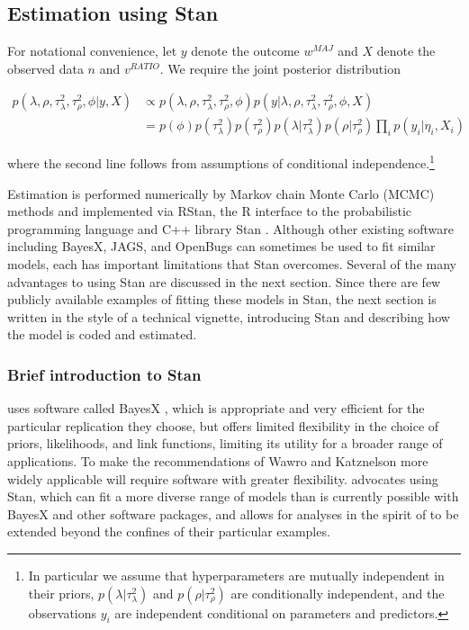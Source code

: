 \subsection{Estimation using Stan}

For notational convenience, let $y$ denote the outcome $w^{MAJ}$ and $X$ denote the observed data $n$ and $v^{RATIO}$. We require the joint posterior distribution

\begin{align*}
p(\lambda, \rho, \tau^2_\lambda, \tau^2_\rho, \phi | y, X) & \propto p(\lambda, \rho, \tau^2_\lambda, \tau^2_\rho, \phi) p(y | \lambda, \rho, \tau^2_\lambda, \tau^2_\rho, \phi,  X)  \\
& = p(\phi) p(\tau^2_\lambda) p(\tau^2_\rho)  p(\lambda | \tau^2_\lambda) p(\rho | \tau^2_\rho) \prod_i p(y_i | \eta_i, X_i) 
\end{align*}

\noindent where the second line follows from assumptions of conditional independence.\footnote{In particular we assume that hyperparameters are mutually independent in their priors, $p(\lambda | \tau^2_\lambda)$ and $p(\rho | \tau^2_\rho)$ are conditionally independent, and the observations $y_i$ are independent conditional on parameters and predictors.}

Estimation is performed numerically by Markov chain Monte Carlo (MCMC) methods and implemented via RStan, the R interface to the probabilistic programming language and C++ library Stan . Although other existing software including BayesX, JAGS, and OpenBugs can sometimes be used to fit similar models, each has important limitations that Stan overcomes. Several of the many advantages to using Stan are discussed in the next section. Since there are few publicly available examples of fitting these models in Stan, the next section is written in the style of a technical vignette, introducing Stan and describing how the model is coded and estimated. 

\subsubsection{Brief introduction to Stan}

 uses software called BayesX , which is appropriate and very efficient for the particular replication they choose, but offers limited flexibility in the choice of priors, likelihoods, and link functions, limiting its utility for a broader range of applications. To make the recommendations of Wawro and Katznelson more widely applicable will require software with greater flexibility.  advocates using Stan, which can fit a more diverse range of models than is currently possible with BayesX and other software packages, and allows for analyses in the spirit of  to be extended beyond the confines of their particular examples.  

